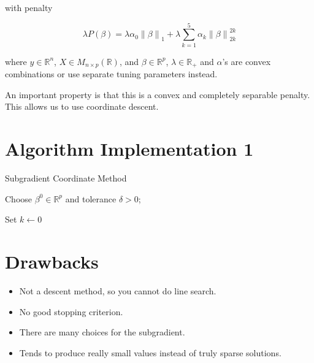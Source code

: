 \documentclass[10pt, reqno]{article}
\numberwithin{equation}{section}
\newcommand{\norm}[1]{\left\lVert#1\right\rVert}
\newcommand{\R}{\mathbb{R}}
\begin{document}
with penalty

\[
\lambda P(\beta) = \lambda \alpha_0 \norm{\beta}_1 + \lambda \sum_{k = 1}^{5} \alpha_k \norm{\beta}_{2k}^{2k} 
\]

where $y \in \R^n$, $X \in M_{n \times p}(\R)$, and $\beta \in \R^p$, $\lambda \in \R_{+}$ and $\alpha$'s are convex combinations or use separate tuning parameters instead.

\vspace{1cm}
An important property is that this is a convex and completely separable penalty. This allows us to use coordinate descent.

\newpage
\section*{Algorithm Implementation 1}

\vspace{.5cm}
\begin{algorithm}[H]
\caption{Subgradient Coordinate Method}
Choose $\beta^0 \in \R^p$ and tolerance $\delta > 0$;

Set $k \gets 0$


\end{algorithm}

\newpage
\section*{Drawbacks}

\begin{itemize}
\item Not a descent method, so you cannot do line search.

\item No good stopping criterion.

\item There are many choices for the subgradient.

\item Tends to produce really small values instead of truly sparse solutions.

\end{itemize}
\end{document}
